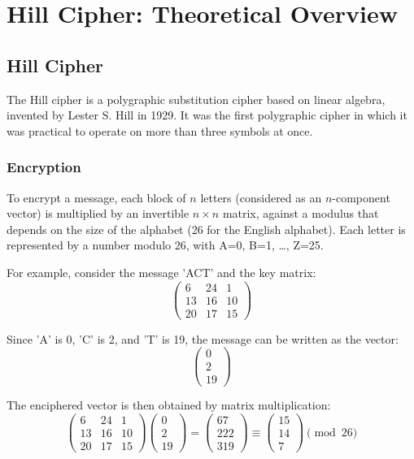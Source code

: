 \documentclass[12pt,a4paper]{article}
\begin{document}

\section*{Hill Cipher: Theoretical Overview}

\subsection*{Hill Cipher}

The Hill cipher is a polygraphic substitution cipher based on linear algebra, invented by Lester S. Hill in 1929. It was the first polygraphic cipher in which it was practical to operate on more than three symbols at once.

\subsubsection*{Encryption}

To encrypt a message, each block of $n$ letters (considered as an $n$-component vector) is multiplied by an invertible $n \times n$ matrix, against a modulus that depends on the size of the alphabet (26 for the English alphabet). Each letter is represented by a number modulo 26, with A=0, B=1, \ldots, Z=25.

For example, consider the message 'ACT' and the key matrix:
\[
\begin{pmatrix}
6 & 24 & 1 \\
13 & 16 & 10 \\
20 & 17 & 15
\end{pmatrix}
\]

Since 'A' is 0, 'C' is 2, and 'T' is 19, the message can be written as the vector:
\[
\begin{pmatrix}
0 \\
2 \\
19
\end{pmatrix}
\]

The enciphered vector is then obtained by matrix multiplication:
\[
\begin{pmatrix}
6 & 24 & 1 \\
13 & 16 & 10 \\
20 & 17 & 15
\end{pmatrix}
\begin{pmatrix}
0 \\
2 \\
19
\end{pmatrix}
=
\begin{pmatrix}
67 \\
222 \\
319
\end{pmatrix}
\equiv 
\begin{pmatrix}
15 \\
14 \\
7
\end{pmatrix} \pmod {26}
\]
\end{document}
